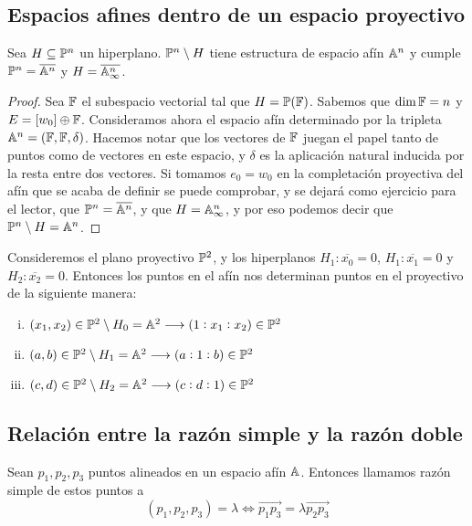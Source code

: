  \subsection{Espacios afines dentro de un espacio proyectivo}

 \begin{prop}
   Sea $H \subseteq \mathbb{P}^n$ un hiperplano. $\mathbb{P}^n \setminus H$ tiene estructura de
   espacio afín $\mathbb{A}^n$ y cumple $\mathbb{P}^n = \overline{\mathbb{A}^n}$ y $H = \overline{\mathbb{A}^n_\infty}$.
 \end{prop}

 \begin{proof}
  Sea $\mathbb{F}$ el subespacio vectorial tal que $H = \mathbb{P}(\mathbb{F})$. Sabemos que $\dim \mathbb{F} = n$ y
  $E = [w_0] \oplus \mathbb{F}$. Consideramos ahora el espacio afín determinado por la tripleta
  $\mathbb{A}^n = (\mathbb{F}, \mathbb{F}, \delta)$. Hacemos notar que los vectores de $\mathbb{F}$ juegan el papel 
  tanto de puntos como de vectores
  en este espacio, y $\delta$ es la aplicación natural inducida por la resta entre dos
  vectores. Si tomamos $e_0 = w_0$ en la completación proyectiva
  del afín que se acaba de definir se puede comprobar, y se dejará como ejercicio para
  el lector, que $\mathbb{P}^n = \overline{\mathbb{A}^n}$, y que $H = \mathbb{A}^n_\infty$, y por eso podemos
  decir que $\mathbb{P}^n \setminus H = \mathbb{A}^n$.
 \end{proof}

\begin{example}
  Consideremos el plano proyectivo $\mathbb{P}^2$, y los hiperplanos $H_1\colon \overline{x_0} = 0$,
  $H_1 \colon \overline{x_1} = 0$ y $H_2 \colon \overline{x_2} = 0$. Entonces los puntos
  en el afín nos determinan puntos en el proyectivo de la siguiente manera:
  \begin{enumerate}[i)]
    \item $(x_1, x_2) \in \mathbb{P}^2 \setminus H_0 = \mathbb{A}^2 \longrightarrow (1:x_1:x_2) \in \mathbb{P}^2$
    \item $(a, b) \in \mathbb{P}^2 \setminus H_1 = \mathbb{A}^2 \longrightarrow (a:1:b) \in \mathbb{P}^2$
    \item $(c, d) \in \mathbb{P}^2 \setminus H_2 = \mathbb{A}^2 \longrightarrow (c:d:1) \in \mathbb{P}^2$
  \end{enumerate}
\end{example}

\subsection{Relación entre la razón simple y la razón doble}

\begin{defi}
Sean $p_1, p_2, p_3$ puntos alineados en un espacio afín $\mathbb{A}$. Entonces llamamos razón
simple de estos puntos a
\[(p_1, p_2, p_3) = \lambda \iff \overrightarrow{p_1p_3} = \lambda \overrightarrow{p_2p_3}\]
\end{defi}


